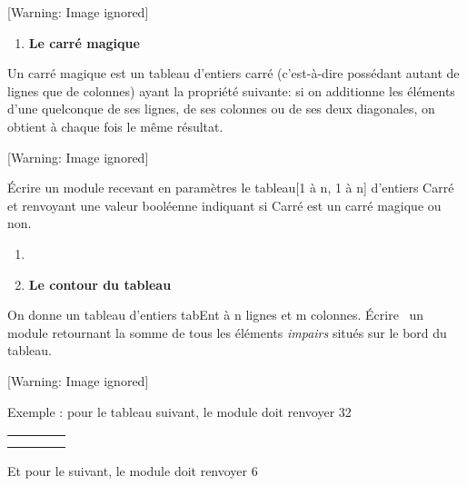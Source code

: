 \begin{center}
 [Warning: Image ignored] %

\end{center}
\liststyleExercice
\setcounter{saveenum}{\value{enumi}}
\begin{enumerate}
\setcounter{enumi}{\value{saveenum}}
\item {\sffamily\bfseries
Le carré magique}
\end{enumerate}
{
Un carré magique est un tableau d’entiers carré
(c'est-à-dire possédant autant de lignes que de
colonnes) ayant la propriété suivante: si on additionne les éléments
d'une quelconque de ses lignes, de ses colonnes ou de
ses deux diagonales, on obtient à chaque fois le même résultat.}

\begin{center}
 [Warning: Image ignored] %

\end{center}
{
Écrire un module recevant en paramètres le tableau[1 à n, 1 à n]
d'entiers Carré et renvoyant une valeur booléenne
indiquant si Carré est un carré magique ou non.}

\liststyleExercice
\setcounter{saveenum}{\value{enumi}}
\begin{enumerate}
\setcounter{enumi}{\value{saveenum}}
\item[] 
\bigskip
\item {\sffamily\bfseries
Le contour du tableau}
\end{enumerate}
{
On donne un tableau d’entiers tabEnt à n lignes et m colonnes. Écrire
\ un module retournant la somme de tous les éléments \textit{impairs}
situés sur le bord du tableau.}

\begin{center}
 [Warning: Image ignored] %

\end{center}
{
Exemple : pour le tableau suivant, le module doit renvoyer 32}

\begin{center}
\tablehead{}
\begin{supertabular}{|m{0.62200004cm}|m{0.624cm}|m{0.624cm}|m{0.64100003cm}|}
\hline
{} &
 &
 &
\raggedleft{}\\\hline
{} &
 &
 &
\raggedleft{}\\\hline
{} &
 &
 &
\raggedleft{}\\\hline
\end{supertabular}
\end{center}
{
Et pour le suivant, le module doit renvoyer 6}

